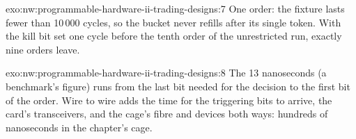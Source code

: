 \begin{solution}{exo:nw:programmable-hardware-ii-trading-designs:7}
One order: the fixture lasts fewer than 10\,000 cycles, so the bucket never refills after its single token. With the kill bit set one cycle
before the tenth order of the unrestricted run, exactly nine orders leave.
\end{solution}

\begin{solution}{exo:nw:programmable-hardware-ii-trading-designs:8}
The 13 nanoseconds (a benchmark's figure) runs from the last bit needed for the decision to the first bit of the order. Wire to wire adds the
time for the triggering bits to arrive, the card's transceivers, and the cage's fibre and devices both ways: hundreds of nanoseconds in
the chapter's cage.
\end{solution}

